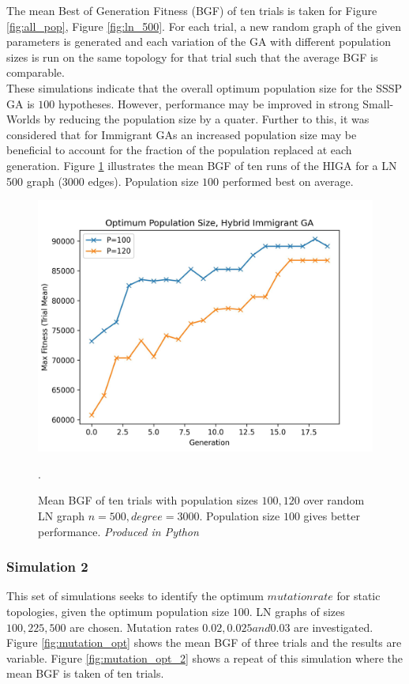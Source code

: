 \documentclass[
	a4paper, %
	10pt, %
	unnumberedsections, %
	twoside, %
]{LTJournalArticle}
\begin{document}
The mean Best of Generation Fitness (BGF) of ten trials is taken for Figure \ref{fig:all_pop}, Figure \ref{fig:ln_500}. For each trial, a new random graph of the given parameters is generated and each variation of the GA with different population sizes is run on the same topology for that trial such that the average BGF is comparable. \\ 

These simulations indicate that the overall optimum population size for the SSSP GA is \(100\) hypotheses. However, performance may be improved in strong Small-Worlds by reducing the population size by a quater. Further to this, it was considered that for Immigrant GAs an increased population size may be beneficial to account for the fraction of the population replaced at each generation. Figure \ref{fig:higa_pop} illustrates the mean BGF of ten runs of the HIGA for a LN 500 graph (3000 edges). Population size \(100\) performed best on average. \\

\begin{figure}[H]
	\includegraphics[width=\linewidth]{Figures/sims/population/higa_pop.jpg}
	\caption{Mean BGF of ten trials with population sizes \(100, 120\) over random LN graph \(n = 500, degree = 3000\). Population size \(100\) gives better performance. \emph{Produced in Python}}. 
	\label{fig:higa_pop}
\end{figure}

\subsubsection{Simulation 2} This set of simulations seeks to identify the optimum \(mutation rate\) for static topologies, given the optimum population size \(100\). LN graphs of sizes \(100, 225, 500\) are chosen. Mutation rates \(0.02, 0.025 and 0.03\) are investigated. Figure \ref{fig:mutation_opt} shows the mean BGF of three trials and the results are variable. Figure \ref{fig:mutation_opt_2} shows a repeat of this simulation where the mean BGF is taken of ten trials. 
\end{document}
